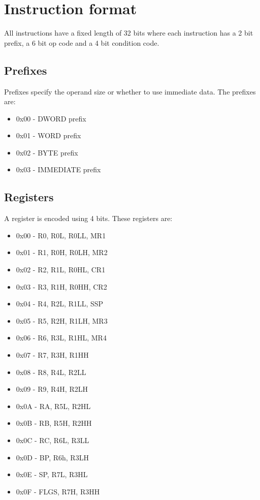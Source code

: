 \section{Instruction format}

All instructions have a fixed length of 32 bits where each instruction has a 2 bit prefix, a 6 bit op code and a 4 bit condition code. 

\subsection{Prefixes}

Prefixes specify the operand size or whether to use immediate data. The prefixes are: \\

\begin{itemize}
	\item 0x00 - DWORD prefix
	\item 0x01 - WORD prefix
	\item 0x02 - BYTE prefix
	\item 0x03 - IMMEDIATE prefix
\end{itemize}

\subsection{Registers}

A register is encoded using 4 bits. These registers are: \\

\begin{itemize}
	\item 0x00 - R0, R0L, R0LL, MR1
	\item 0x01 - R1, R0H, R0LH, MR2
	\item 0x02 - R2, R1L, R0HL, CR1
	\item 0x03 - R3, R1H, R0HH, CR2
	\item 0x04 - R4, R2L, R1LL, SSP
	\item 0x05 - R5, R2H, R1LH, MR3
	\item 0x06 - R6, R3L, R1HL, MR4
	\item 0x07 - R7, R3H, R1HH
	\item 0x08 - R8, R4L, R2LL
	\item 0x09 - R9, R4H, R2LH
	\item 0x0A - RA, R5L, R2HL
	\item 0x0B - RB, R5H, R2HH
	\item 0x0C - RC, R6L, R3LL
	\item 0x0D - BP, R6h, R3LH
	\item 0x0E - SP, R7L, R3HL
	\item 0x0F - FLGS, R7H, R3HH
\end{itemize}

